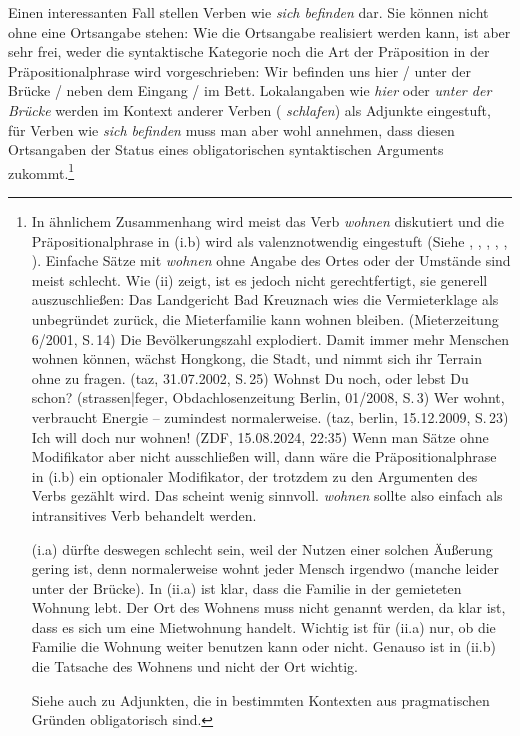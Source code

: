 \noindent
Einen interessanten Fall stellen Verben wie \emph{sich befinden} dar. Sie können
nicht ohne eine Ortsangabe stehen:
\z
Wie die Ortsangabe realisiert werden kann, ist aber sehr frei, weder die syntaktische
Kategorie noch die Art der Präposition %
in der Präpositionalphrase wird vorgeschrieben:
\ea
Wir befinden uns hier / unter der Brücke / neben dem Eingang / im Bett.
\z
Lokalangaben wie \emph{hier} oder \emph{unter der Brücke} werden im Kontext anderer Verben (\zb
\emph{schlafen}) als Adjunkte eingestuft, für Verben wie \emph{sich befinden} muss man aber wohl
annehmen, dass diesen Ortsangaben der Status eines obligatorischen syntaktischen Arguments zukommt.\footnote{
  In ähnlichem Zusammenhang wird meist das Verb \emph{wohnen} diskutiert und
  die Präpositionalphrase in (i.b) wird als valenznotwendig eingestuft 
  (Siehe \zb {}, , , , 
, ).
Einfache Sätze mit \emph{wohnen} ohne Angabe des Ortes oder der Umstände sind meist
        schlecht. 
\eal
{}
\zl
Wie (ii) zeigt, ist es jedoch nicht gerechtfertigt, sie generell auszuschließen:
        \eal
        \ex Das Landgericht Bad Kreuznach wies die Vermieterklage als unbegründet zurück,
            die Mieterfamilie kann wohnen bleiben. (Mieterzeitung 6/2001, S.\,14)
        \ex Die Bevölkerungszahl explodiert. Damit immer mehr Menschen wohnen können, wächst Hongkong, die Stadt, 
            und nimmt sich ihr Terrain ohne zu fragen.  (taz, 31.07.2002, S.\,25)
        \ex Wohnst Du noch, oder lebst Du schon? (strassen|feger, Obdachlosenzeitung Berlin, 01/2008,
        S.\,3)%
\ex Wer wohnt, verbraucht Energie -- zumindest normalerweise. (taz, berlin, 15.12.2009, S.\,23)
\ex Ich will doch nur wohnen! (ZDF, 15.08.2024, 22:35)
        \zl
Wenn man Sätze ohne Modifikator aber nicht ausschließen will, dann wäre
die Präpositionalphrase in (i.b) ein optionaler Modifikator, der trotzdem
zu den Argumenten des Verbs gezählt wird. Das scheint wenig sinnvoll. \emph{wohnen}
sollte also einfach als intransitives Verb behandelt werden.

(i.a) dürfte deswegen schlecht sein, weil der Nutzen einer solchen Äußerung gering ist,
denn normalerweise wohnt jeder Mensch irgendwo (manche leider unter der Brücke).
In (ii.a) ist klar, dass die Familie in der gemieteten Wohnung lebt. Der Ort des Wohnens muss nicht
genannt werden, da klar ist, dass es sich um eine Mietwohnung handelt. Wichtig ist für (ii.a) nur, 
ob die Familie die Wohnung weiter benutzen kann oder nicht.
Genauso ist in (ii.b) die Tatsache des Wohnens und nicht der Ort wichtig.

Siehe auch  zu Adjunkten, die in bestimmten Kontexten aus pragmatischen 
Gründen obligatorisch sind.%
}
